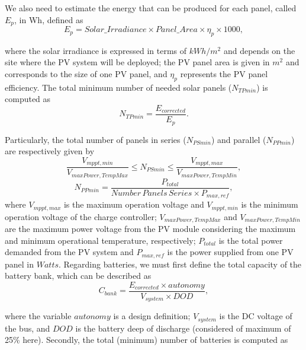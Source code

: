 \documentclass[review]{elsarticle}
\begin{document}
We also need to estimate the energy that can be produced for each panel, called $E_{p}$, in Wh, defined as
%
\begin{equation}
\label{eq:Ep}
E_{p} = Solar\_Irradiance \times Panel\_Area \times \eta_{p} \times 1000,
\end{equation}

\noindent where the solar irradiance is expressed in terms of $kWh/m^{2}$ and depends on the site where the PV system will be deployed; 
the PV panel area is given in $m^{2}$ and corresponds to the size of one PV panel, and $\eta_{p}$ represents the PV panel efficiency.
The total minimum number of needed solar panels ($N_{TPmin}$) is computed as
%
\begin{equation}
\label{eq:NTPmin}
N_{TPmin} = \dfrac{E_{corrected}}{E_{p}}.
\end{equation}

Particularly, the total number of panels in series ($N_{PSmin}$) and parallel ($N_{PPmin}$) are respectively given by
%
\begin{equation}
\label{eq:NPSmin}
\dfrac{V_{mppt,min}}{V_{maxPower,TempMax}} \leq N_{PSmin} \leq \dfrac{V_{mppt,max}}{V_{maxPower,TempMin}},
\end{equation}
%
\begin{equation}
\label{eq:NPPmin}
N_{PPmin} = \dfrac{P_{total}}{Number\,Panels\,Series \times P_{max,ref}},
\end{equation}
%
\noindent where $V_{mppt,max}$ is the maximum operation voltage and $V_{mppt,min}$ 
is the minimum operation voltage of the charge controller; $V_{maxPower,TempMax}$ and 
$V_{maxPower,TempMin}$ are the maximum power voltage from the PV module considering 
the maximum and minimum operational temperature, respectively; 
$P_{total}$ is the total power demanded from the PV system and 
$P_{max,ref}$ is the power supplied from one PV panel in $Watts$.
Regarding batteries, we must first define the total capacity of the battery bank, which can be described as
%
\begin{equation}
\label{eq:Cbank}
C_{bank} = \dfrac{E_{corrected} \times autonomy}{V_{system} \times DOD},
\end{equation}

\noindent where the variable $autonomy$ is a design definition; %
$ V_{system} $ is the DC voltage of the bus, and $ DOD $ is the battery deep of discharge (considered of maximum of 25\% here).
%
Secondly, the total (minimum) number of batteries is computed as 
\end{document}
